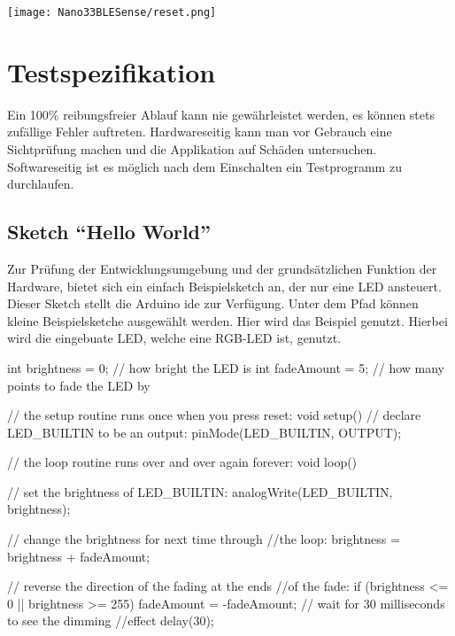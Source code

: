 \begin{center}
    \texttt{[image: Nano33BLESense/reset.png]}
\end{center}





\chapter{Testspezifikation}\label{Nano33:TestSoftware}

Ein 100\% reibungsfreier Ablauf kann nie gewährleistet werden, es können stets zufällige Fehler auftreten. Hardwareseitig kann man vor Gebrauch eine Sichtprüfung machen und die Applikation auf Schäden untersuchen. Softwareseitig ist es möglich nach dem Einschalten ein Testprogramm zu durchlaufen. 

\section{Sketch ``Hello World''}

Zur Prüfung der Entwicklungsumgebung und der grundsätzlichen Funktion der Hardware, bietet sich ein einfach Beispielsketch an, der nur eine LED ansteuert. Dieser Sketch stellt die Arduino \ac{ide} zur Verfügung. Unter dem Pfad  können kleine Beispielsketche ausgewählt werden. Hier wird das Beispiel  genutzt. Hierbei wird die eingebuate LED, welche eine RGB-LED ist, genutzt. 

\begin{Arduino}
    int brightness = 0;  // how bright the LED is
    int fadeAmount = 5;  // how many points to fade the LED by
    
    // the setup routine runs once when you press reset:
    void setup() {
        // declare LED_BUILTIN to be an output:
        pinMode(LED_BUILTIN, OUTPUT);
    }
    
    // the loop routine runs over and over again forever:
    void loop() {
        // set the brightness of LED_BUILTIN:
        analogWrite(LED_BUILTIN, brightness);
        
        // change the brightness for next time through 
        //the loop:
        brightness = brightness + fadeAmount;
        
        // reverse the direction of the fading at the ends 
        //of the fade:
        if (brightness <= 0 || brightness >= 255) {
            fadeAmount = -fadeAmount;
        }
        // wait for 30 milliseconds to see the dimming 
        //effect
        delay(30);
    }
\end{Arduino}

